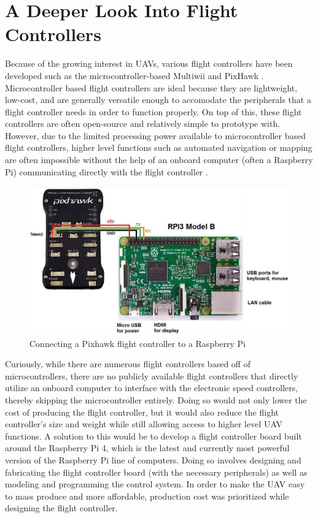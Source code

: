 \documentclass[english]{upeeei}
\begin{document}
\section{A Deeper Look Into Flight Controllers}
Because of the growing interest in UAVs, various flight
controllers have been developed such as the microcontroller-based Multiwii \cite{MultiwiiFC} and PixHawk \cite{RPiMavlink2019}.
Microcontroller based flight controllers are ideal because they are lightweight, low-cost, and are generally versatile enough
to accomodate the peripherals that a flight controller needs in order to function properly. On top of this, these flight controllers
are often open-source and relatively simple to prototype with. However, due to the limited processing power available to 
microcontroller based flight controllers, higher level functions such as automated navigation or mapping are often impossible 
without the help of an onboard computer (often a Raspberry Pi) communicating directly with the flight controller 
\cite{RPiMavlink2019,Redtail2017,Dowling2018,Navio2,AirPy}.
\begin{figure}[h]
    \centering
    \includegraphics[scale=0.5]{images/phawkToPi.PNG}
    \caption{Connecting a Pixhawk flight controller to a Raspberry Pi \cite{RPiMavlink2019}}
    \label{fig:phawkToPi}
\end{figure}
Curiously, while there are numerous flight controllers based off of microcontrollers, there are no publicly available flight 
controllers that directly utilize an onboard computer to interface with the electronic speed controllers, thereby skipping
the microcontroller entirely. Doing so would not only lower the cost of producing the flight controller, but it would also
reduce the flight controller's size and weight while still allowing access to higher level UAV functions. A solution to this
would be to develop a flight controller board built around the Raspberry Pi 4, which is the latest and currently most powerful
version of the Raspberry Pi line of computers. Doing so involves designing and fabricating the flight controller board (with
the necessary peripherals) as well as modeling and programming the control system. In order to make the UAV easy to mass produce 
and more affordable, production cost was prioritized while designing the flight controller. 
\end{document}
